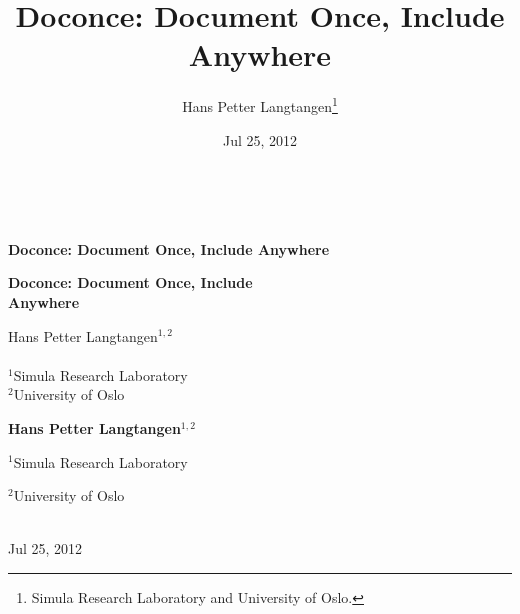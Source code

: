 \documentclass{book}
\begin{document}


\title{Doconce: Document Once, Include Anywhere}


\thispagestyle{empty}
\hbox{\ \ }
\vfill
\begin{center}
{\huge{\bfseries{Doconce: Document Once, Include Anywhere}}}


\begin{center}
{\LARGE\bf Doconce: Document Once, Include \\ [1.5mm] Anywhere}
\end{center}




\author{Hans Petter Langtangen\footnote{Simula Research Laboratory and University of Oslo.}}

\vspace{1.3cm}

{\Large\textsf{Hans Petter Langtangen${}^{1, 2}$}}\\ [3mm]

\ \\ [2mm]

{\large\textsf{${}^1$Simula Research Laboratory} \\ [1.5mm]}
{\large\textsf{${}^2$University of Oslo} \\ [1.5mm]}


\begin{center}
{\bf Hans Petter Langtangen${}^{1, 2}$} \\ [0mm]
\end{center}

\begin{center}
\centerline{{\small ${}^1$Simula Research Laboratory}}
\centerline{{\small ${}^2$University of Oslo}}
\end{center}





\date{Jul 25, 2012}
\maketitle


\ \\ [10mm]
{\large\textsf{Jul 25, 2012}}

\end{center}
\vfill
\clearpage
\end{document}
